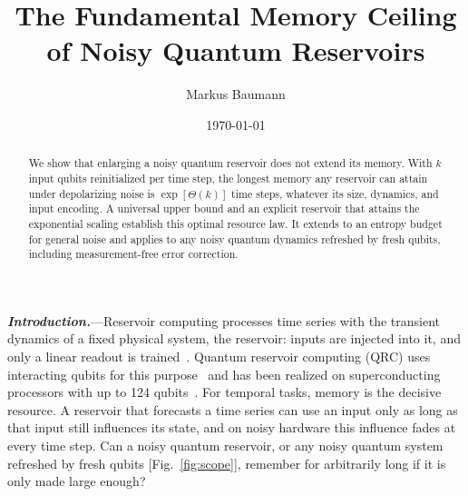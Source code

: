 \documentclass[aps,prl,twocolumn,superscriptaddress,floatfix]{revtex4-2}
\theoremstyle{plain}
\newcommand{\runin}[1]{\textit{\textbf{#1}}---}
\begin{document}
\let\SMaddcontentsline\addcontentsline
\renewcommand{\addcontentsline}[3]{}

\title{The Fundamental Memory Ceiling of Noisy Quantum Reservoirs}

\author{Markus Baumann}

\date{\today}

\begin{abstract}
We show that enlarging a noisy quantum reservoir does not extend its memory. With $k$ input qubits reinitialized per time step, the longest memory any reservoir can attain under depolarizing noise is $\exp[\Theta(k)]$ time steps, whatever its size, dynamics, and input encoding. A universal upper bound and an explicit reservoir that attains the exponential scaling establish this optimal resource law. It extends to an entropy budget for general noise and applies to any noisy quantum dynamics refreshed by fresh qubits, including measurement-free error correction.
\end{abstract}

\maketitle


\runin{Introduction.}Reservoir computing processes time series with the transient dynamics of a fixed physical system, the reservoir: inputs are injected into it, and only a linear readout is trained~\cite{Jaeger2001,Maass2002,JaegerHaas2004,Lukosevicius2009,Tanaka2019}. Quantum reservoir computing (QRC) uses interacting qubits for this purpose~\cite{Fujii2017,Nakajima2019,Mujal2021} and has been realized on superconducting processors with up to 124 qubits~\cite{Chen2020,Suzuki2022,Yasuda2023,Hu2024,Monzani2024,Dao2026}. For temporal tasks, memory is the decisive resource. A reservoir that forecasts a time series can use an input only as long as that input still influences its state, and on noisy hardware this influence fades at every time step. Can a noisy quantum reservoir, or any noisy quantum system refreshed by fresh qubits [Fig.~\ref{fig:scope}], remember for arbitrarily long if it is only made large enough?
\end{document}
